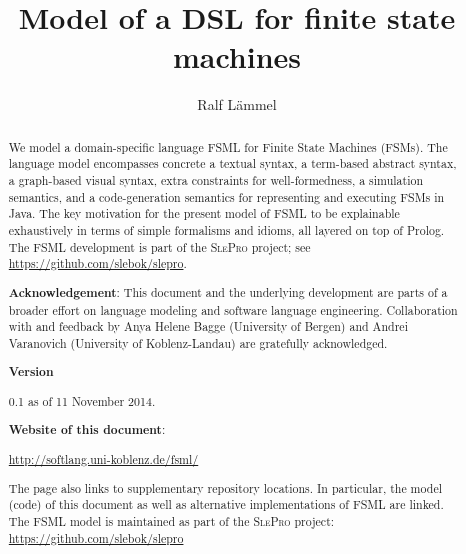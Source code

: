 \documentclass[preprint,authoryear,12pt]{noelsarticle}
\newcommand{\slepro}{\textsc{SlePro}}
\begin{document}
\begin{frontmatter}

\title{Model of a DSL for finite state machines}

\author{Ralf L\"ammel}

\address{Software Languages Team\\University of Koblenz-Landau, Germany}

\begin{abstract}
  We model a domain-specific language FSML for Finite State Machines
  (FSMs). The language model encompasses concrete a textual syntax, a
  term-based abstract syntax, a graph-based visual syntax, extra
  constraints for well-formedness, a simulation semantics, and a
  code-generation semantics for representing and executing FSMs in
  Java. The key motivation for the present model of FSML to be
  explainable exhaustively in terms of simple formalisms and idioms,
  all layered on top of Prolog. The FSML development is part of the
  \slepro{} project; see \url{https://github.com/slebok/slepro}.

\bigskip

\noindent
\textbf{Acknowledgement}: {\small This document and the underlying
  development are parts of a broader effort on language modeling and
  software language engineering. Collaboration with and feedback by
  Anya Helene Bagge (University of Bergen) and Andrei Varanovich
  (University of Koblenz-Landau) are gratefully acknowledged.}

\medskip

\noindent
\textbf{Version}

0.1 as of 11 November 2014.

\medskip

\noindent
\textbf{Website of this document}: 

\smallskip

\url{http://softlang.uni-koblenz.de/fsml/}

\smallskip

\noindent
The page also links to supplementary repository locations. In
particular, the model (code) of this document as well as alternative
implementations of FSML are linked. The FSML model is maintained as
part of the \slepro{} project: \url{https://github.com/slebok/slepro}
\end{abstract}

\end{frontmatter}

\pagebreak

\end{document}
